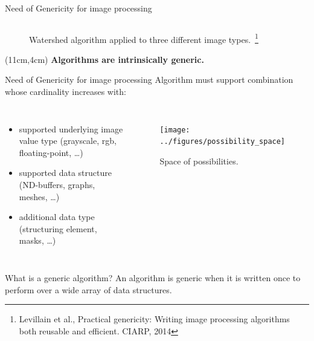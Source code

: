 \documentclass[12pt,aspectratio=169]{beamer}
\begin{document}
\begin{frame}[fragile]{Need of Genericity for image processing}
\begin{figure}[htbp]
\begin{tabular}{cccc}
      \\
    \end{tabular}
    \label{fig:type.vs.algo}
    \caption{Watershed algorithm applied to three different image types.~\footnote{Levillain et al., Practical
        genericity: Writing image processing algorithms both reusable and efficient. CIARP, 2014}}
  \end{figure}
  \begin{textblock*}{4cm}(11cm,4cm)
    \textbf{Algorithms are intrinsically generic.}
  \end{textblock*}
\end{frame}


\begin{frame}[fragile]{Need of Genericity for image processing}
  Algorithm must support combination whose cardinality increases with:

  \begin{columns}[T,onlytextwidth]
    \begin{itemize}
      \item supported underlying image value type (grayscale, rgb, floating-point, \ldots)
      \item supported data structure (ND-buffers, graphs, meshes, \ldots)
      \item additional data type (structuring element, masks, \ldots)
    \end{itemize}

    \begin{figure}[htbp]
      \centering
      \texttt{[image: ../figures/possibility\_space]}
      \caption{Space of possibilities.}
      \label{fig:int.possibility_space}
    \end{figure}
  \end{columns}

  \begin{alertblock}{What is a generic algorithm?}
    An algorithm is generic when it is written once to perform over a wide array of data structures.
  \end{alertblock}
\end{frame}
\end{document}
